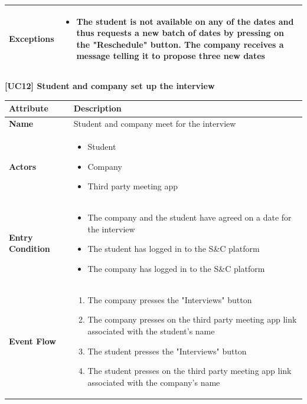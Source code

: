\begin{center}
\begin{tabular}{|p{3cm}|p{9cm}|}
    \textbf{Exceptions} & 
    \begin{itemize}
        \item [4a.] The student is not available on any of the dates and thus requests a new batch of dates by pressing on the "Reschedule" button. The company receives a message telling it to propose three new dates
    \end{itemize} \\ \hline
    \end{tabular}
    \newline
    \newline
    \textbf{[UC12] Student and company set up the interview}
    \newline
    \newline
    
    
    \begin{tabular}{|p{3cm}|p{9cm}|}
    \hline
    \textbf{Attribute} & \textbf{Description} \\ \hline
    \textbf{Name} & Student and company meet for the interview \\ \hline
    \textbf{Actors} & 
    \begin{itemize}
        \item Student
        \item Company
        \item Third party meeting app
    \end{itemize} \\ \hline
    \textbf{Entry Condition} & 
    \begin{itemize}
        \item The company and the student have agreed on a date for the interview
        \item The student has logged in to the S\&C platform
        \item The company has logged in to the S\&C platform
    \end{itemize}\\ \hline
    \textbf{Event Flow} & 
    \begin{enumerate}
        \item The company presses the "Interviews" button
        \item The company presses on the third party meeting app link associated with the student's name
        \item The student presses the "Interviews" button
        \item The student presses on the third party meeting app link associated with the company's name

\end{enumerate}
\end{tabular}
\end{center}
